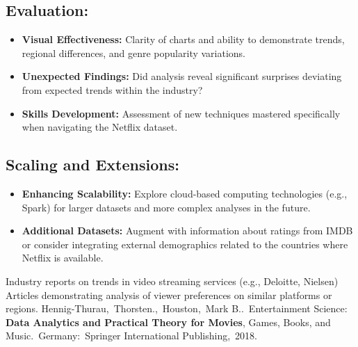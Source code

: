 \documentclass[12pt]{article}
\begin{document}
\subsection{Evaluation:}


\begin{itemize}
\item 	\textbf{Visual Effectiveness:} \newline
Clarity of charts and ability to demonstrate trends, regional differences, and genre popularity variations.
\item 	\textbf{Unexpected Findings:  }\newline
Did analysis reveal significant surprises deviating from expected trends within the industry?
\item 	\textbf{Skills Development:   }\newline
Assessment of new techniques mastered specifically when navigating the Netflix dataset.



\end{itemize}

\subsection{Scaling and Extensions:}


\begin{itemize}
\item 	\textbf{Enhancing Scalability:} \newline
Explore cloud-based computing technologies (e.g., Spark) for larger datasets and more complex analyses in the future.
\item 	\textbf{Additional Datasets:   }\newline
Augment with information about ratings from IMDB or consider integrating external demographics related to the countries where Netflix is available.




\end{itemize}





 










 Industry reports on trends in video streaming services (e.g., Deloitte, Nielsen)\newline
Articles demonstrating analysis of viewer preferences on similar platforms or regions.\newline
Hennig-Thurau, Thorsten., Houston, Mark B.. Entertainment Science: \textbf{Data Analytics and Practical Theory for Movies}, Games, Books, and Music. Germany: Springer International Publishing, 2018.\newline
\end{document}
